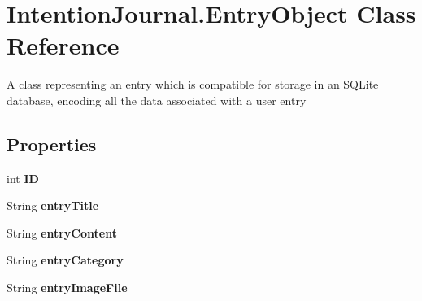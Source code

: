 \hypertarget{class_intention_journal_1_1_entry_object}{}\section{Intention\+Journal.\+Entry\+Object Class Reference}
\label{class_intention_journal_1_1_entry_object}


A class representing an entry which is compatible for storage in an S\+Q\+Lite database, encoding all the data associated with a user entry  


\subsection*{Properties}
\begin{DoxyCompactItemize}
\item 
\mbox{\label{class_intention_journal_1_1_entry_object_a1ab883484464ce5475bcd03bd42ce6c8}} 
int {\bfseries ID}
\item 
\mbox{\label{class_intention_journal_1_1_entry_object_aa508f9bc8dfe2c9de569eef54d1ecbd5}} 
String {\bfseries entry\+Title}
\item 
\mbox{\label{class_intention_journal_1_1_entry_object_a0ca8a00bc1ada2afd6a1cab7ef5f10df}} 
String {\bfseries entry\+Content}
\item 
\mbox{\label{class_intention_journal_1_1_entry_object_a202329fd9002364591460ec1e2bee629}} 
String {\bfseries entry\+Category}
\item 
\mbox{\label{class_intention_journal_1_1_entry_object_ae28dc0402ec30c5261731825be1b7560}} 
String {\bfseries entry\+Image\+File}

\end{DoxyCompactItemize}
